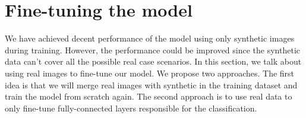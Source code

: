 \section{Fine-tuning the model}

We have achieved decent performance of the model using only synthetic images during training. However, the performance could be improved since the synthetic data can't cover all the possible real case scenarios. In this section, we talk about using real images to fine-tune our model. We propose two approaches. The first idea is that we will merge real images with synthetic in the training dataset and train the model from scratch again. The second approach is to use real data to only fine-tune fully-connected layers responsible for the classification. 



